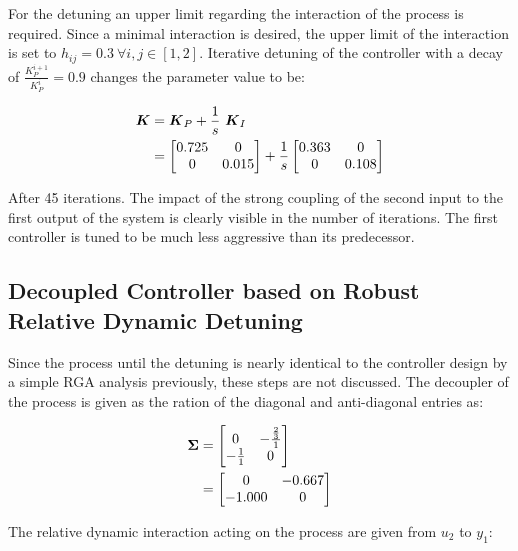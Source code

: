  For the detuning an upper limit regarding the interaction of the process is required. Since a minimal interaction is desired, the upper limit of the interaction is set to $h_{ij} = 0.3 ~ \forall i,j \in [1,2]$. Iterative detuning of the controller with a decay of $\frac{K_P^{i+1}}{K_P^{i}} = 0.9 $ changes the parameter value to be:

\begin{align}
\mbox{\boldmath$K$} &= \mbox{\boldmath$K$}_P + \frac{1}{s}~ \mbox{\boldmath$K$}_I\\
&= \begin{bmatrix}
0.725 & 0 \\
0 & 0.015
\end{bmatrix}
+ \frac{1}{s}\begin{bmatrix}
0.363 & 0 \\
0 & 0.108
\end{bmatrix}
\end{align}

After 45 iterations. The impact of the strong coupling of the second input to the first output of the system is clearly visible in the number of iterations. The first controller is tuned to be much less aggressive than its predecessor.



\subsection{Decoupled Controller based on Robust Relative Dynamic Detuning}
\label{c:fotd:s:rosenbrock:ss:modifiedastr}

Since the process until the detuning is nearly identical to the controller design by a simple RGA analysis previously, these steps are not discussed. The decoupler of the process is given as the ration of the diagonal and anti-diagonal entries as:

\begin{align*}
\begin{split}
\mbox{\boldmath$\Sigma$} &= \begin{bmatrix}
0 & -\frac{\frac{2}{3}}{1} \\
-\frac{1}{1} & 0
\end{bmatrix}
\\
&= \begin{bmatrix}
0 & -0.667 \\
-1.000 & 0
\end{bmatrix}
\end{split}
\end{align*}

The relative dynamic interaction acting on the process are given from $u_2$ to $y_1$:

